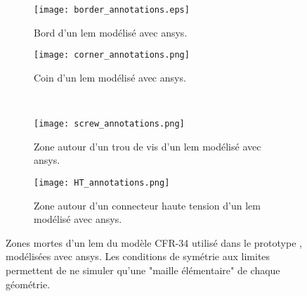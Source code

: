         \begin{figure}[htbp]
          \begin{subfigure}[t]{0.61\textwidth}
            \centering
            \texttt{[image: border\_annotations.eps]}
            \caption{\label{fig::lem_border}Bord d'un \gls{lem} modélisé avec \gls{ansys}.}
          \end{subfigure}
          \hfill
          \begin{subfigure}[t]{0.31\textwidth}
            \centering
            \texttt{[image: corner\_annotations.png]}
            \caption{\label{fig::corner}Coin d'un \gls{lem} modélisé avec \gls{ansys}.}
          \end{subfigure}\\
          \begin{subfigure}[b]{0.42\textwidth}
            \centering
            \texttt{[image: screw\_annotations.png]}
            \caption{\label{fig::screw}Zone autour d'un trou de vis d'un \gls{lem} modélisé avec \gls{ansys}.}
          \end{subfigure}
          \hfill
          \begin{subfigure}[b]{0.48\textwidth}
            \centering
            \texttt{[image: HT\_annotations.png]}
            \caption{\label{fig::HT}Zone autour d'un connecteur haute tension d'un \gls{lem} modélisé avec \gls{ansys}.}
          \end{subfigure}
          \caption[Zones mortes d'un LEM modélisé avec ANSYS.]{Zones mortes d'un \gls{lem} du modèle CFR-34 utilisé dans le prototype \TOO{}, modélisées avec \gls{ansys}. Les conditions de symétrie aux limites permettent de ne simuler qu'une "maille élémentaire" de chaque géométrie.}
          \label{fig::zones_mortes}
        \end{figure}
            
